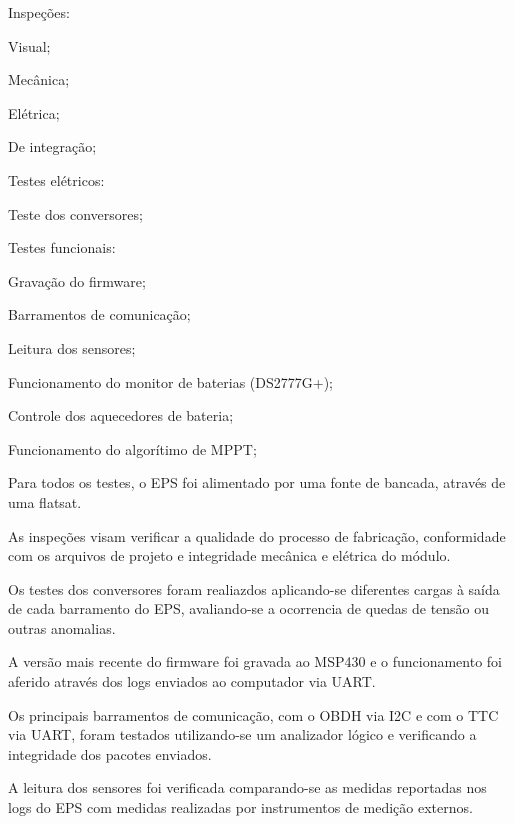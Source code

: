 \begin{alineas}
    \item Inspeções:
    \begin{alineas}
        \item Visual;
        \item Mecânica;
        \item Elétrica;
        \item De integração;
    \end{alineas}
    \item Testes elétricos:
    \begin{alineas}
        \item Teste dos conversores;
    \end{alineas}
    \item Testes funcionais:
    \begin{alineas}
        \item Gravação do firmware;
        \item Barramentos de comunicação;
        \item Leitura dos sensores;
        \item Funcionamento do monitor de baterias (DS2777G+);
        \item Controle dos aquecedores de bateria;
        \item Funcionamento do algorítimo de \gls{MPPT};
    \end{alineas}
\end{alineas}

Para todos os testes, o \gls{EPS} foi alimentado por uma fonte de bancada, através de uma flatsat.

As inspeções visam verificar a qualidade do processo de fabricação, conformidade com os arquivos de projeto e integridade mecânica e elétrica do módulo.

Os testes dos conversores foram realiazdos aplicando-se diferentes cargas à saída de cada barramento do \gls{EPS}, avaliando-se a ocorrencia de quedas de tensão ou outras anomalias.

A versão mais recente do firmware foi gravada ao MSP430 e o funcionamento foi aferido através dos logs enviados ao computador via \gls{UART}.

Os principais barramentos de comunicação, com o \gls{OBDH} via \gls{I2C} e com o \gls{TTC} via \gls{UART}, foram testados utilizando-se um analizador lógico e verificando a integridade dos pacotes enviados.

A leitura dos sensores foi verificada comparando-se as medidas reportadas nos logs do \gls{EPS} com medidas realizadas por instrumentos de medição externos.

